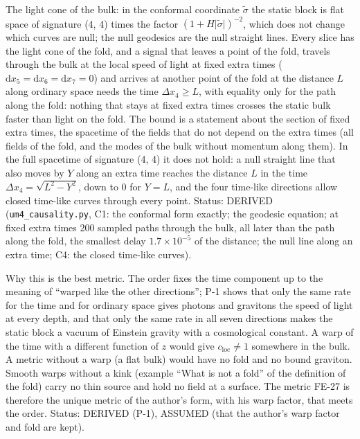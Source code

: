 \documentclass[
  10pt,
]{article}
\begin{document}
The light cone of the bulk: in the conformal coordinate \(\tilde\sigma\)
the static block is flat space of signature (4, 4) times the factor
\((1 + H\lvert\tilde\sigma\rvert)^{-2}\), which does not change which
curves are null; the null geodesics are the null straight lines. Every
slice has the light cone of the fold, and a signal that leaves a point
of the fold, travels through the bulk at the local speed of light at
fixed extra times
(\(\mathrm{d}x_5 = \mathrm{d}x_6 = \mathrm{d}x_7 = 0\)) and arrives at
another point of the fold at the distance \(L\) along ordinary space
needs the time \(\Delta x_4 \ge L\), with equality only for the path
along the fold: nothing that stays at fixed extra times crosses the
static bulk faster than light on the fold. The bound is a statement
about the section of fixed extra times, the spacetime of the fields that
do not depend on the extra times (all fields of the fold, and the modes
of the bulk without momentum along them). In the full spacetime of
signature (4, 4) it does not hold: a null straight line that also moves
by \(Y\) along an extra time reaches the distance \(L\) in the time
\(\Delta x_4 = \sqrt{L^2 - Y^2}\), down to 0 for \(Y = L\), and the four
time-like directions allow closed time-like curves through every point.
Status: DERIVED (\texttt{um4\_causality.py}, C1: the conformal form
exactly; the geodesic equation; at fixed extra times 200 sampled paths
through the bulk, all later than the path along the fold, the smallest
delay \(1.7\times10^{-5}\) of the distance; the null line along an extra
time; C4: the closed time-like curves).

Why this is the best metric. The order fixes the time component up to
the meaning of ``warped like the other directions''; P-1 shows that only
the same rate for the time and for ordinary space gives photons and
gravitons the speed of light at every depth, and that only the same rate
in all seven directions makes the static block a vacuum of Einstein
gravity with a cosmological constant. A warp of the time with a
different function of \(z\) would give \(c_{\mathrm{loc}} \ne 1\)
somewhere in the bulk. A metric without a warp (a flat bulk) would have
no fold and no bound graviton. Smooth warps without a kink (example
``What is not a fold'' of the definition of the fold) carry no thin
source and hold no field at a surface. The metric FE-27 is therefore the
unique metric of the author's form, with his warp factor, that meets the
order. Status: DERIVED (P-1), ASSUMED (that the author's warp factor and
fold are kept).
\end{document}
